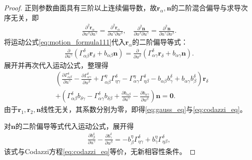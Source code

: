 \documentclass[../../main.tex]{subfiles}%
\begin{document}
\begin{proof}
正则参数曲面具有三阶以上连续偏导数，故$\boldsymbol{r}_\alpha,\boldsymbol{n}$的二阶混合偏导与求导次序无关，即
\begin{align*}
\frac{\partial^2 \boldsymbol{r}_\alpha}{\partial u^\beta\partial u^\gamma} = \frac{\partial^2 \boldsymbol{r}_\alpha}{\partial u^\gamma\partial u^\beta},\quad \frac{\partial^2 \boldsymbol{n}}{\partial u^\beta\partial u^\gamma} = \frac{\partial^2 \boldsymbol{n}}{\partial u^\gamma\partial u^\beta}.
\end{align*}
将运动公式\eqref{eq:motion_formula111}代入$\boldsymbol{r}_\alpha$的二阶偏导等式：
\begin{align*}
\frac{\partial}{\partial u^\gamma}\left(\Gamma^\delta_{\alpha\beta}\boldsymbol{r}_\delta + b_{\alpha\beta}\boldsymbol{n}\right) = \frac{\partial}{\partial u^\beta}\left(\Gamma^\delta_{\alpha\gamma}\boldsymbol{r}_\delta + b_{\alpha\gamma}\boldsymbol{n}\right).
\end{align*}
展开并再次代入运动公式，整理得
\begin{align*}
&\left(\frac{\partial \Gamma^\delta_{\alpha\beta}}{\partial u^\gamma}-\frac{\partial \Gamma^\delta_{\alpha\gamma}}{\partial u^\beta}+\Gamma^\eta_{\alpha\beta}\Gamma^\delta_{\eta\gamma}-\Gamma^\eta_{\alpha\gamma}\Gamma^\delta_{\eta\beta}-b_{\alpha\beta}b^\delta_\gamma + b_{\alpha\gamma}b^\delta_\beta\right)\boldsymbol{r}_\delta\\
&+\left(\Gamma^\delta_{\alpha\beta}b_{\delta\gamma}-\Gamma^\delta_{\alpha\gamma}b_{\delta\beta}+\frac{\partial b_{\alpha\beta}}{\partial u^\gamma}-\frac{\partial b_{\alpha\gamma}}{\partial u^\beta}\right)\boldsymbol{n} = \boldsymbol{0}.
\end{align*}
由于$\boldsymbol{r}_1,\boldsymbol{r}_2,\boldsymbol{n}$线性无关，其系数分别为零，即得\eqref{eq:gauss_eq}与\eqref{eq:codazzi_eq}。

对$\boldsymbol{n}$的二阶偏导等式代入运动公式，展开得
\begin{align*}
\frac{\partial b^\delta_\beta}{\partial u^\gamma}-\frac{\partial b^\delta_\gamma}{\partial u^\beta} = -b^\eta_\beta\Gamma^\delta_{\eta\gamma}+b^\eta_\gamma\Gamma^\delta_{\eta\beta},
\end{align*}
该式与Codazzi方程\eqref{eq:codazzi_eq}等价，无新相容性条件。
\end{proof}
\end{document}
